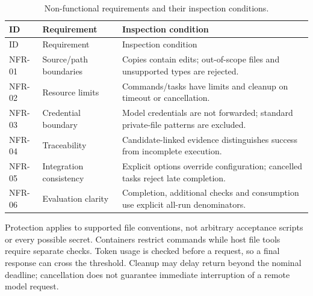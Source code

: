 \begin{longtable}[]{@{}
  >{\raggedright\arraybackslash}p{}
  >{\raggedright\arraybackslash}p{}
  >{\raggedright\arraybackslash}p{}@{}}
\caption[Non-functional requirements]{Non-functional requirements and their inspection conditions.}\label{tab:3-3}\tabularnewline
\toprule\noalign{}
\begin{minipage}[b]{\linewidth}\raggedright
ID
\end{minipage} & \begin{minipage}[b]{\linewidth}\raggedright
Requirement
\end{minipage} & \begin{minipage}[b]{\linewidth}\raggedright
Inspection condition
\end{minipage} \\
\midrule\noalign{}
\endfirsthead
\toprule\noalign{}
\begin{minipage}[b]{\linewidth}\raggedright
ID
\end{minipage} & \begin{minipage}[b]{\linewidth}\raggedright
Requirement
\end{minipage} & \begin{minipage}[b]{\linewidth}\raggedright
Inspection condition
\end{minipage} \\
\midrule\noalign{}
\endhead
\bottomrule\noalign{}
\endlastfoot
NFR-01 & Source/path boundaries & Copies contain edits; out-of-scope files and unsupported types are rejected. \\
NFR-02 & Resource limits & Commands/tasks have limits and cleanup on timeout or cancellation. \\
NFR-03 & Credential boundary & Model credentials are not forwarded; standard private-file patterns are excluded. \\
NFR-04 & Traceability & Candidate-linked evidence distinguishes success from incomplete execution. \\
NFR-05 & Integration consistency & Explicit options override configuration; cancelled tasks reject late completion. \\
NFR-06 & Evaluation clarity & Completion, additional checks and consumption use explicit all-run denominators. \\
\end{longtable}

Protection applies to supported file conventions, not arbitrary acceptance scripts or every possible secret. Containers restrict commands while host file tools require separate checks. Token usage is checked before a request, so a final response can cross the threshold. Cleanup may delay return beyond the nominal deadline; cancellation does not guarantee immediate interruption of a remote model request.

